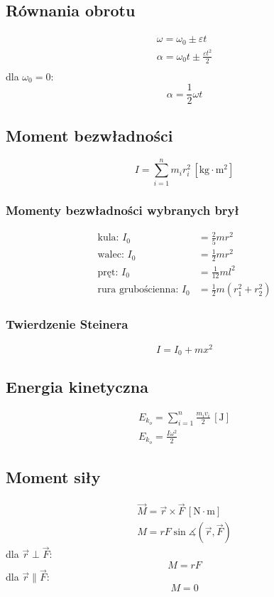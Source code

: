 \documentclass{article}
\numberwithin{equation}{section}
\newcommand{\unit}[1]{\, \left[\mathrm{#1}\right]}
\begin{document}
      \subsection{Równania obrotu}
        \begin{gather}
          \omega = \omega_0 \pm \varepsilon t\\
          \alpha = \omega_0t \pm \frac{\varepsilon t^2}{2}\\
        \end{gather}
        dla $\omega_0 = 0$:
        \begin{equation}
          \alpha = \frac{1}{2} \omega t
        \end{equation}
    \subsection{Moment bezwładności}
      \begin{equation}
        I = \sum_{i=1}^n m_ir_i^2 \unit{kg\cdot m^2}
      \end{equation}
      \subsubsection{Momenty bezwładności wybranych brył}
        \begin{align}
          \text{kula: } I_0 &= \frac{2}{5}mr^2\\
          \text{walec: } I_0 &= \frac{1}{2}mr^2\\
          \text{pręt: } I_0 &= \frac{1}{12}ml^2\\
          \text{rura grubościenna: } I_0 &= \frac{1}{2}m(r_1^2 + r_2^2)
        \end{align}
      \subsubsection{Twierdzenie Steinera}
        \begin{equation}
          I = I_0 +mx^2
        \end{equation}
    \subsection{Energia kinetyczna}
      \begin{gather}
        E_{k_o} = \sum_{i=1}^n \frac{m_iv_i}{2} \unit{J}\\
        E_{k_o} = \frac{I\omega^2}{2}
      \end{gather}
    \subsection{Moment siły}
      \begin{gather}
        \vec M = \vec r\times\vec F \unit{N\cdot m}\\
        M = rF\sin\measuredangle (\vec r, \vec F)
      \end{gather}
      dla $\vec r \perp \vec F$:
      \begin{equation}
        M = rF
      \end{equation}
      dla $\vec r \parallel \vec F$:
      \begin{equation}
        M = 0
      \end{equation}
\end{document}
